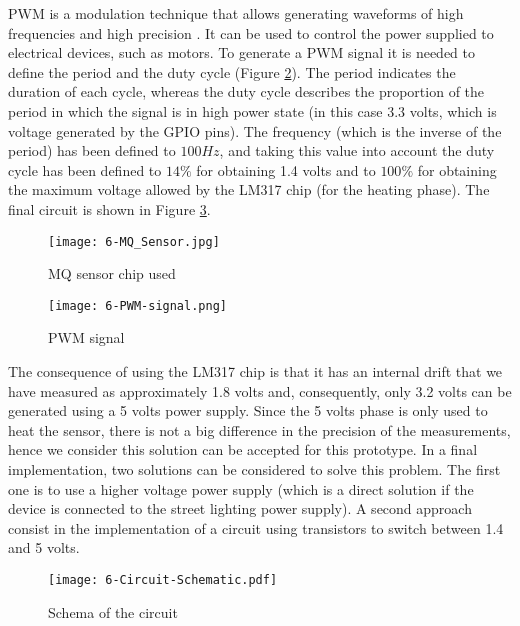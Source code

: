 \ac{PWM} is a modulation technique that allows generating waveforms of high frequencies and high precision \cite{DdlT16}. It can be used to control the power supplied to electrical devices, such as motors. To generate a \ac{PWM} signal it is needed to define the period and the duty cycle (Figure \ref{fig:6-PWM-signal}). The period indicates the duration of each cycle, whereas the duty cycle describes the proportion of the period in which the signal is in high power state (in this case 3.3 volts, which is voltage generated by the GPIO pins). The frequency (which is the inverse of the period) has been defined to $100 Hz$, and taking this value into account the duty cycle has been defined to $14\%$ for obtaining 1.4 volts and to $100\%$ for obtaining the maximum voltage allowed by the LM317 chip (for the heating phase). The final circuit is shown in Figure \ref{fig:6-Circuit-Schematic}.

\begin{figure}[!h]
	\begin{center}
		\texttt{[image: 6-MQ\_Sensor.jpg]}
		\caption{MQ sensor chip used}
		\label{fig:6-MQ_Sensor}
	\end{center}
\end{figure}

\begin{figure}[!h]
	\begin{center}
		\texttt{[image: 6-PWM-signal.png]}
		\caption{PWM signal}
		\label{fig:6-PWM-signal}
	\end{center}
\end{figure}

The consequence of using the LM317 chip is that it has an internal drift that we have measured as approximately 1.8 volts and, consequently, only 3.2 volts can be generated using a 5 volts power supply. Since the 5 volts phase is only used to heat the sensor, there is not a big difference in the precision of the measurements, hence we consider this solution can be accepted for this prototype. In a final implementation, two solutions can be considered to solve this problem. The first one is to use a higher voltage power supply (which is a direct solution if the device is connected to the street lighting power supply). A second approach consist in the implementation of a circuit using transistors to switch between 1.4 and 5 volts.

\begin{figure}[!h]
	\begin{center}
		\texttt{[image: 6-Circuit-Schematic.pdf]}
		\caption{Schema of the circuit}
		\label{fig:6-Circuit-Schematic}
	\end{center}
\end{figure}




